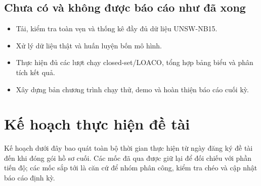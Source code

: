 \documentclass[12pt,a4paper,oneside]{article}
\begin{document}
\subsection{Chưa có và không được báo cáo như đã xong}
\begin{itemize}[leftmargin=1.05cm,itemsep=0.2em]
\item Tải, kiểm tra toàn vẹn và thống kê đầy đủ dữ liệu UNSW-NB15.
\item Xử lý dữ liệu thật và huấn luyện bốn mô hình.
\item Thực hiện đủ các lượt chạy closed-set/LOACO, tổng hợp bảng biểu và phân tích kết quả.
\item Xây dựng bản chương trình chạy thử, demo và hoàn thiện báo cáo cuối kỳ.
\end{itemize}

\section{Kế hoạch thực hiện đề tài}

Kế hoạch dưới đây bao quát toàn bộ thời gian thực hiện từ ngày đăng ký đề tài đến khi đóng gói hồ sơ cuối. Các mốc đã qua được giữ lại để đối chiếu với phần tiến độ; các mốc sắp tới là căn cứ để nhóm phân công, kiểm tra chéo và cập nhật báo cáo định kỳ.
\end{document}

